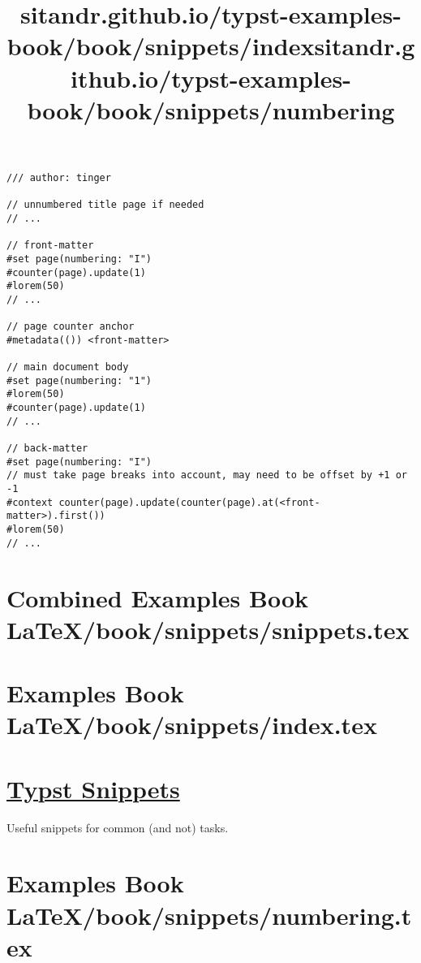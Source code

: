 \begin{verbatim}
/// author: tinger

// unnumbered title page if needed
// ...

// front-matter
#set page(numbering: "I")
#counter(page).update(1)
#lorem(50)
// ...

// page counter anchor
#metadata(()) <front-matter>

// main document body
#set page(numbering: "1")
#lorem(50)
#counter(page).update(1)
// ...

// back-matter
#set page(numbering: "I")
// must take page breaks into account, may need to be offset by +1 or -1
#context counter(page).update(counter(page).at(<front-matter>).first())
#lorem(50)
// ...
\end{verbatim}

\pandocbounded{}

\pandocbounded{}

\pandocbounded{}




\section{Combined Examples Book LaTeX/book/snippets/snippets.tex}
\section{Examples Book LaTeX/book/snippets/index.tex}
\title{sitandr.github.io/typst-examples-book/book/snippets/index}

\section{\texorpdfstring{\hyperref[typst-snippets]{Typst
Snippets}}{Typst Snippets}}\label{typst-snippets}

Useful snippets for common (and not) tasks.


\section{Examples Book LaTeX/book/snippets/numbering.tex}
\title{sitandr.github.io/typst-examples-book/book/snippets/numbering}

